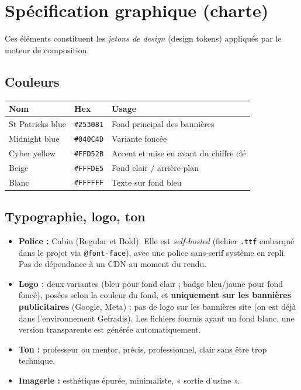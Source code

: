 \documentclass[11pt,a4paper]{article}
\begin{document}
\section{Spécification graphique (charte)}
Ces éléments constituent les \emph{jetons de design} (design tokens) appliqués
par le moteur de composition.

\subsection{Couleurs}
\begin{center}\small
\begin{tabular}{@{}l l l@{}}
\toprule
\textbf{Nom} & \textbf{Hex} & \textbf{Usage} \\
\midrule
St Patricks blue & \texttt{\#253081} & Fond principal des bannières \\
Midnight blue & \texttt{\#040C4D} & Variante foncée \\
Cyber yellow & \texttt{\#FFD52B} & Accent et mise en avant du chiffre clé \\
Beige & \texttt{\#FFFDE5} & Fond clair / arrière-plan \\
Blanc & \texttt{\#FFFFFF} & Texte sur fond bleu \\
\bottomrule
\end{tabular}
\end{center}

\subsection{Typographie, logo, ton}
\begin{itemize}[leftmargin=1.4em]
  \item \textbf{Police :} Cabin (Regular et Bold). Elle est \emph{self-hosted}
        (fichier \texttt{.ttf} embarqué dans le projet via \texttt{@font-face}),
        avec une police sans-serif système en repli. Pas de dépendance à un CDN au
        moment du rendu.
  \item \textbf{Logo :} deux variantes (bleu pour fond clair ; badge bleu/jaune pour
        fond foncé), posées selon la couleur du fond, et \textbf{uniquement sur les
        bannières publicitaires} (Google, Meta) ; pas de logo sur les bannières site
        (on est déjà dans l'environnement Gefradis). Les fichiers fournis ayant un
        fond blanc, une version transparente est générée automatiquement.
  \item \textbf{Ton :} professeur ou mentor, précis, professionnel, clair sans
        être trop technique.
  \item \textbf{Imagerie :} esthétique épurée, minimaliste, « sortie d'usine ».
\end{itemize}
\end{document}
